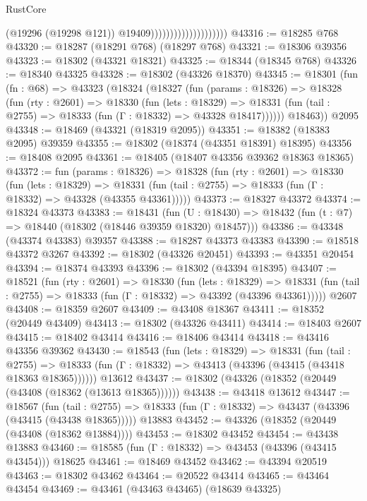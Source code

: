\begin{lexlean}{RustCore}
\begin{coremodule}
                                            (@19296 (@19298 @121))
                                            @19409))))))))))))))))))))
@43316 := @18285 @768
@43320 := @18287 (@18291 @768) (@18297 @768)
@43321 := @18306 @39356
@43323 := @18302 (@43321 @18321)
@43325 := @18344 (@18345 @768)
@43326 := @18340 @43325
@43328 := @18302 (@43326 @18370)
@43345 := @18301
    (fun (fn : @68) =>
    @43323
      (@18324
        (@18327
          (fun (params : @18326) =>
          @18328
            (fun (rty : @2601) =>
            @18330
              (fun (lets : @18329) =>
              @18331 (fun (tail : @2755) => @18333 (fun (Γ : @18332) => @43328 @18417))))))
        @18463))
    @2095
@43348 := @18469 (@43321 (@18319 @2095))
@43351 := @18382 (@18383 @2095) @39359
@43355 := @18302 (@18374 (@43351 @18391) @18395)
@43356 := @18408 @2095
@43361 := @18405 (@18407 @43356 @39362 @18363 @18365)
@43372 := fun (params : @18326) =>
  @18328
    (fun (rty : @2601) =>
    @18330
      (fun (lets : @18329) =>
      @18331 (fun (tail : @2755) => @18333 (fun (Γ : @18332) => @43328 (@43355 @43361)))))
@43373 := @18327 @43372
@43374 := @18324 @43373
@43383 := @18431
    (fun (U : @18430) => @18432 (fun (t : @7) => @18440 (@18302 (@18446 @39359 @18320) @18457)))
@43386 := @43348 (@43374 @43383) @39357
@43388 := @18287 @43373 @43383
@43390 := @18518 @43372 @3267
@43392 := @18302 (@43326 @20451)
@43393 := @43351 @20454
@43394 := @18374 @43393
@43396 := @18302 (@43394 @18395)
@43407 := @18521
    (fun (rty : @2601) =>
    @18330
      (fun (lets : @18329) =>
      @18331 (fun (tail : @2755) => @18333 (fun (Γ : @18332) => @43392 (@43396 @43361)))))
    @2607
@43408 := @18359 @2607
@43409 := @43408 @18367
@43411 := @18352 (@20449 @43409)
@43413 := @18302 (@43326 @43411)
@43414 := @18403 @2607
@43415 := @18402 @43414
@43416 := @18406 @43414
@43418 := @43416 @43356 @39362
@43430 := @18543
    (fun (lets : @18329) =>
    @18331
      (fun (tail : @2755) =>
      @18333 (fun (Γ : @18332) => @43413 (@43396 (@43415 (@43418 @18363 @18365))))))
    @13612
@43437 := @18302 (@43326 (@18352 (@20449 (@43408 (@18362 (@13613 @18365))))))
@43438 := @43418 @13612
@43447 := @18567
    (fun (tail : @2755) => @18333 (fun (Γ : @18332) => @43437 (@43396 (@43415 (@43438 @18365)))))
    @13883
@43452 := @43326 (@18352 (@20449 (@43408 (@18362 @13884))))
@43453 := @18302 @43452
@43454 := @43438 @13883
@43460 := @18585 (fun (Γ : @18332) => @43453 (@43396 (@43415 @43454))) @18625
@43461 := @18469 @43452
@43462 := @43394 @20519
@43463 := @18302 @43462
@43464 := @20522 @43414
@43465 := @43464 @43454
@43469 := @43461 (@43463 @43465) (@18639 @43325)

\end{coremodule}
\end{lexlean}
